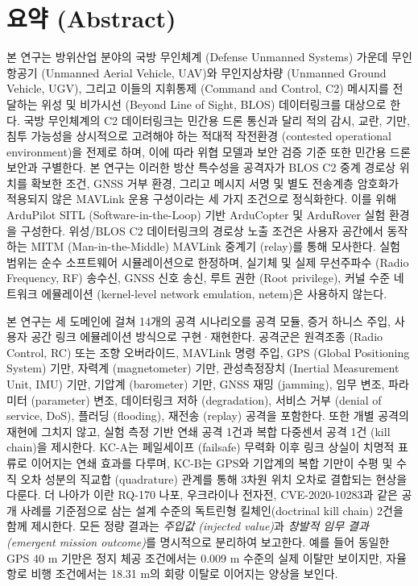 \section{요약 (Abstract)}

본 연구는 방위산업 분야의 국방 무인체계 (Defense Unmanned Systems) 가운데 무인항공기 (Unmanned Aerial Vehicle, UAV)와 무인지상차량 (Unmanned Ground Vehicle, UGV), 그리고 이들의 지휘통제 (Command and Control, C2) 메시지를 전달하는 위성 및 비가시선 (Beyond Line of Sight, BLOS) 데이터링크를 대상으로 한다. 
%
국방 무인체계의 C2 데이터링크는 민간용 드론 통신과 달리 적의 감시, 교란, 기만, 침투 가능성을 상시적으로 고려해야 하는 적대적 작전환경 (contested operational environment)을 전제로 하며, 이에 따라 위협 모델과 보안 검증 기준 또한 민간용 드론 보안과 구별한다. 
%
본 연구는 이러한 방산 특수성을 공격자가 BLOS C2 중계 경로상 위치를 확보한 조건, GNSS 거부 환경, 그리고 메시지 서명 및 별도 전송계층 암호화가 적용되지 않은 MAVLink 운용 구성이라는 세 가지 조건으로 정식화한다.
%
이를 위해 ArduPilot SITL (Software-in-the-Loop) 기반 ArduCopter 및 ArduRover 실험 환경을 구성한다.
%
위성/BLOS C2 데이터링크의 경로상 노출 조건은 사용자 공간에서 동작하는 MITM (Man-in-the-Middle) MAVLink 중계기 (relay)를 통해 모사한다. 
%
실험 범위는 순수 소프트웨어 시뮬레이션으로 한정하며, 실기체 및 실제 무선주파수 (Radio Frequency, RF) 송수신, GNSS 신호 송신, 루트 권한 (Root privilege), 커널 수준 네트워크 에뮬레이션 (kernel-level network emulation, netem)은 사용하지 않는다.


본 연구는 세 도메인에 걸쳐 14개의 공격 시나리오를 공격 모듈, 증거 하니스 주입, 사용자 공간 링크 에뮬레이션 방식으로 구현·재현한다. 공격군은 원격조종 (Radio Control, RC) 또는 조향 오버라이드, MAVLink 명령 주입, GPS (Global Positioning System) 기만, 자력계 (magnetometer) 기만, 관성측정장치 (Inertial Measurement Unit, IMU) 기만, 기압계 (barometer) 기만, GNSS 재밍 (jamming), 임무 변조, 파라미터 (parameter) 변조, 데이터링크 저하 (degradation), 서비스 거부 (denial of service, DoS), 플러딩 (flooding), 재전송 (replay) 공격을 포함한다. 
%
또한 개별 공격의 재현에 그치지 않고, 실험 측정 기반 연쇄 공격 1건과 복합 다중센서 공격 1건 (kill chain)을 제시한다. KC-A는 페일세이프 (failsafe) 무력화 이후 링크 상실이 치명적 표류로 이어지는 연쇄 효과를 다루며, KC-B는 GPS와 기압계의 복합 기만이 수평 및 수직 오차 성분의 직교합 (quadrature) 관계를 통해 3차원 위치 오차로 결합되는 현상을 다룬다. 
%
더 나아가 이란 RQ-170 나포, 우크라이나 전자전, CVE-2020-10283과 같은 공개 사례를 기준점으로 삼는 설계 수준의 독트린형 킬체인(doctrinal kill chain) 2건을 함께 제시한다. 
%
모든 정량 결과는 \emph{주입값 (injected value)}과 \emph{창발적 임무 결과 (emergent mission outcome)}를 명시적으로 분리하여 보고한다. 예를 들어 동일한 GPS 40 m 기만은 정지 체공 조건에서는 0.009 m 수준의 실제 이탈만 보이지만, 자율 항로 비행 조건에서는 18.31 m의 회랑 이탈로 이어지는 양상을 보인다.
%

